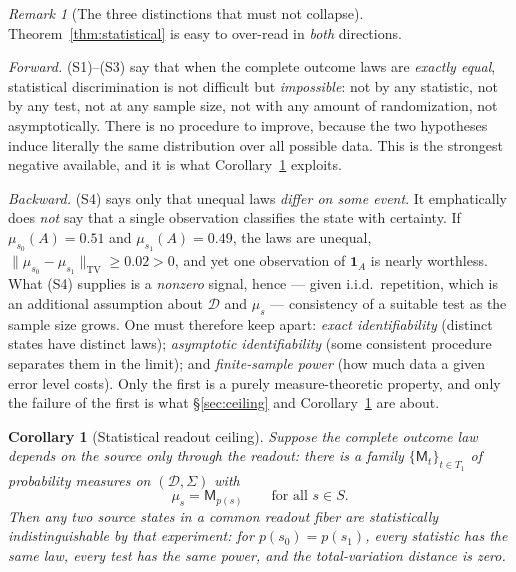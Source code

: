\documentclass[11pt,reqno]{amsart}
\theoremstyle{plain}
\newtheorem{corollary}[theorem]{Corollary}
\theoremstyle{definition}
\theoremstyle{remark}
\newtheorem{remark}[theorem]{Remark}
\newcommand{\TV}{\mathrm{TV}}
\begin{document}
\begin{remark}[The three distinctions that must not collapse]\label{rem:statscope}
Theorem~\ref{thm:statistical} is easy to over-read in \emph{both} directions.

\emph{Forward.} (S1)--(S3) say that when the complete outcome laws are \emph{exactly equal}, statistical discrimination is not difficult but \emph{impossible}: not by any statistic, not by any test, not at any sample size, not with any amount of randomization, not asymptotically. There is no procedure to improve, because the two hypotheses induce literally the same distribution over all possible data. This is the strongest negative available, and it is what Corollary~\ref{cor:statceiling} exploits.

\emph{Backward.} (S4) says only that unequal laws \emph{differ on some event}. It emphatically does \emph{not} say that a single observation classifies the state with certainty. If $\mu_{s_0}(A)=0.51$ and $\mu_{s_1}(A)=0.49$, the laws are unequal, $\|\mu_{s_0}-\mu_{s_1}\|_{\TV}\ge0.02>0$, and yet one observation of $\mathbf 1_A$ is nearly worthless. What (S4) supplies is a \emph{nonzero} signal, hence --- given i.i.d.\ repetition, which is an additional assumption about $\mathcal D$ and $\mu_s$ --- consistency of a suitable test as the sample size grows. One must therefore keep apart: \emph{exact identifiability} (distinct states have distinct laws); \emph{asymptotic identifiability} (some consistent procedure separates them in the limit); and \emph{finite-sample power} (how much data a given error level costs). Only the first is a purely measure-theoretic property, and only the failure of the first is what \S\ref{sec:ceiling} and Corollary~\ref{cor:statceiling} are about.
\end{remark}

\begin{corollary}[Statistical readout ceiling]\label{cor:statceiling}
Suppose the complete outcome law depends on the source only through the readout: there is a family $\{\mathsf M_t\}_{t\in T_1}$ of probability measures on $(\mathcal D,\Sigma)$ with
\begin{equation}\label{eq:statfactor}
\mu_s=\mathsf M_{p(s)}\qquad\text{for all }s\in S .
\end{equation}
Then any two source states in a common readout fiber are \emph{statistically indistinguishable} by that experiment: for $p(s_0)=p(s_1)$, every statistic has the same law, every test has the same power, and the total-variation distance is zero.
\end{corollary}
\end{document}
